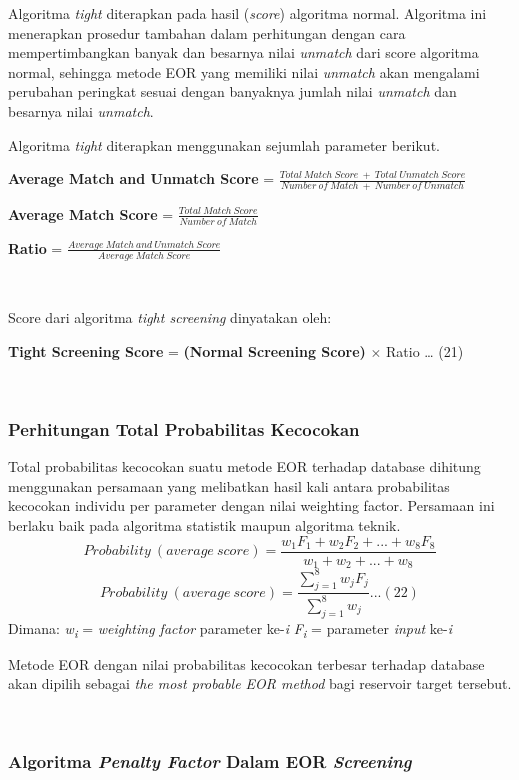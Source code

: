 \documentclass[
]{book}
\begin{document}
Algoritma \emph{tight} diterapkan pada hasil (\emph{score}) algoritma normal. Algoritma ini menerapkan prosedur tambahan dalam perhitungan dengan cara mempertimbangkan banyak dan besarnya nilai \emph{unmatch} dari score algoritma normal, sehingga metode EOR yang memiliki nilai \emph{unmatch} akan mengalami perubahan peringkat sesuai dengan banyaknya jumlah nilai \emph{unmatch} dan besarnya nilai \emph{unmatch}.

Algoritma \emph{tight} diterapkan menggunakan sejumlah parameter berikut.

\textbf{Average Match and Unmatch Score} = \(\frac{Total\ Match\ Score\ +\ Total\ Unmatch\ Score}{Number\ of\ Match\ +\ Number\ of\ Unmatch}\)

\textbf{Average Match Score} = \(\frac{Total\ Match\ Score}{Number\ of\ Match}\)

\textbf{Ratio} = \(\frac{Average\ Match\ and\ Unmatch\ Score}{Average\ Match\ Score}\)

~

Score dari algoritma \emph{tight screening} dinyatakan oleh:

\textbf{Tight Screening Score} = \textbf{(Normal Screening Score)} \(\times\) Ratio \ldots{} (21)

~

\hypertarget{perhitungan-total-probabilitas-kecocokan}{%
\subsubsection{Perhitungan Total Probabilitas Kecocokan}\label{perhitungan-total-probabilitas-kecocokan}}

Total probabilitas kecocokan suatu metode EOR terhadap database dihitung menggunakan persamaan yang melibatkan hasil kali antara probabilitas kecocokan individu per parameter dengan nilai weighting factor. Persamaan ini berlaku baik pada algoritma statistik maupun algoritma teknik.
\[Probability\ (average\ score) = \frac{w_1F_1+w_2F_2+...+w_8F_8}{w_1+w_2+...+w_8}\]
\[Probability\ (average\ score) = \frac{\sum_{j=1}^{8}w_jF_j }{\sum_{j=1}^{8}w_j}...(22)\]
Dimana:
\emph{w\textsubscript{i}} = \emph{weighting factor} parameter ke-\emph{i}
\emph{F\textsubscript{i}} = parameter \emph{input} ke-\emph{i}

Metode EOR dengan nilai probabilitas kecocokan terbesar terhadap database akan dipilih sebagai \emph{the most probable EOR method} bagi reservoir target tersebut.

~

\hypertarget{algoritma-penalty-factor-dalam-eor-screening}{%
\subsubsection{\texorpdfstring{Algoritma \emph{Penalty Factor} Dalam EOR \emph{Screening}}{Algoritma Penalty Factor Dalam EOR Screening}}\label{algoritma-penalty-factor-dalam-eor-screening}}
\end{document}
